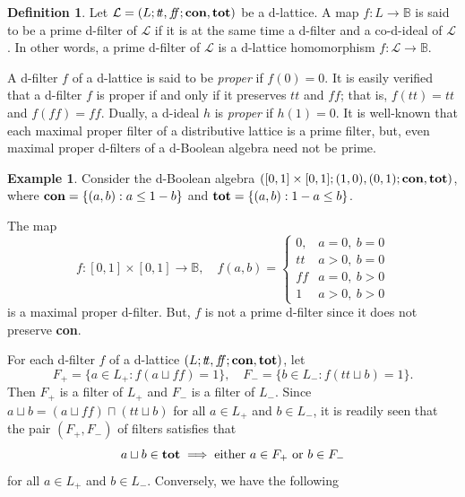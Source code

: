 \documentclass[11pt]{article}
\theoremstyle{plain}
\theoremstyle{definition}
\newtheorem{defn}[thm]{Definition}
\newtheorem{exmp}[thm]{Example}
\newcommand{\bbB}{\mathbb{B}}
\newcommand{\dbt}{{t\!t}}
\newcommand{\dbf}{{f\!\!f}}
\newcommand{\lra}{\longrightarrow}
\begin{document}
\begin{defn} 
Let $\mathcal{L}=(L;\dbt,\dbf;{\bf con},{\bf tot})$ be a d-lattice. A map $f\colon L\lra \bbB$ is said to be a prime d-filter  of $\mathcal{L}$ if it is at the same time a d-filter and a co-d-ideal of $\mathcal{L}$. 
In other words, a prime d-filter of  $\mathcal{L}$ is  a d-lattice homomorphism $f\colon\mathcal{L}\lra \bbB$. \end{defn}

A d-filter $f$ of a d-lattice is said to be \emph{proper} if $f(0)=0$. It is easily verified that a d-filter $f$ is proper if and only if it preserves $\dbt$ and $\dbf$; that is,   $f(\dbt)=\dbt$ and $f(\dbf)=\dbf$. Dually, a d-ideal $h$  is  \emph{proper} if $h(1)=0$. 
It is well-known that each maximal proper filter of a distributive lattice is a prime filter, but, even maximal proper d-filters of a d-Boolean algebra  need not be prime.

\begin{exmp}   Consider the d-Boolean algebra $([0,1]\times[0,1]; (1,0),(0,1);{\bf con},{\bf tot})$, where ${\bf con}=\{(a,b):a\leq 1-b\}$ and ${\bf tot}=\{(a,b):1-a\leq b\}$.   \begin{center}
 \end{center} 
The  map $$ f\colon [0,1]\times [0,1]\lra \bbB, \quad f(a,b)=\begin{cases}0,& a=0,~b=0 \\ \dbt &a>0,~b=0 \\ \dbf &a=0,~b>0 \\ 1 & a>0,~b>0 \end{cases}$$  is a maximal proper d-filter. But, $f$ is not a prime d-filter since it does not preserve {\bf con}.  
\end{exmp} 

For each d-filter $f$ of a d-lattice $(L;\dbt,\dbf;{\bf con},{\bf tot})$, let   $$ 
F_+=\{a\in L_+:f(a\sqcup\dbf)=1\},\quad F_-=\{b\in L_-:f(\dbt\sqcup b)=1\}.$$ Then $F_+$ is a filter of $L_+$  and $F_-$ is a filter of $L_-$. Since $a\sqcup b= (a\sqcup\dbf)\sqcap(\dbt\sqcup b)$ for all $a\in L_+$ and $b\in L_-$,  it is readily seen that the pair $(F_+,F_-)$ of filters satisfies that $$ a\sqcup b\in{\bf tot}\implies \text{either $a\in F_+$ or $b\in F_-$} $$  for all $a\in L_+$ and $b\in L_-$. Conversely, we have the following 
\end{document}
